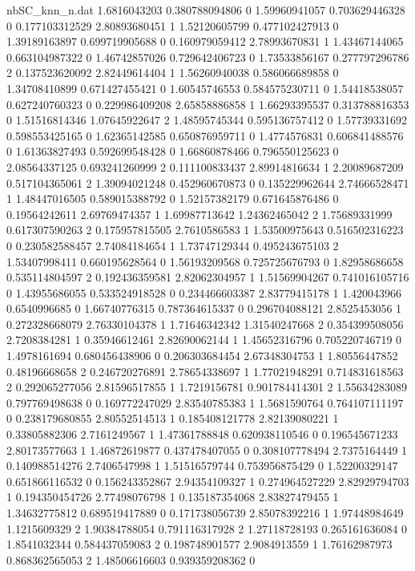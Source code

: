 \begin{filecontents}{nbSC_knn_n.dat}
1.6816043203 0.380788094806 0
1.59960941057 0.703629446328 0
0.177103312529 2.80893680451 1
1.52120605799 0.477102427913 0
1.39189163897 0.699719905688 0
0.160979059412 2.78993670831 1
1.43467144065 0.663104987322 0
1.46742857026 0.729642406723 0
1.73533856167 0.277797296786 2
0.137523620092 2.82449614404 1
1.56260940038 0.586066689858 0
1.34708410899 0.671427455421 0
1.60545746553 0.584575230711 0
1.54418538057 0.627240760323 0
0.229986409208 2.65858886858 1
1.66293395537 0.313788816353 0
1.51516814346 1.07645922647 2
1.48595745344 0.595136757412 0
1.57739331692 0.598553425165 0
1.62365142585 0.650876959711 0
1.4774576831 0.606841488576 0
1.61363827493 0.592699548428 0
1.66860878466 0.796550125623 0
2.08564337125 0.693241260999 2
0.111100833437 2.89914816634 1
2.20089687209 0.517104365061 2
1.39094021248 0.452960670873 0
0.135229962644 2.74666528471 1
1.48447016505 0.589015388792 0
1.52157382179 0.671645876486 0
0.19564242611 2.69769474357 1
1.69987713642 1.24362465042 2
1.75689331999 0.617307590263 2
0.175957815505 2.7610586583 1
1.53500975643 0.516502316223 0
0.230582588457 2.74084184654 1
1.73747129344 0.495243675103 2
1.53407998411 0.660195628564 0
1.56193209568 0.725725676793 0
1.82958686658 0.535114804597 2
0.192436359581 2.82062304957 1
1.51569904267 0.741016105716 0
1.43955686055 0.533524918528 0
0.234466603387 2.83779415178 1
1.420043966 0.6540996685 0
1.66740776315 0.787364615337 0
0.296704088121 2.8525453056 1
0.272328668079 2.76330104378 1
1.71646342342 1.31540247668 2
0.354399508056 2.7208384281 1
0.35946612461 2.82690062144 1
1.45652316796 0.705220746719 0
1.4978161694 0.680456438906 0
0.206303684454 2.67348304753 1
1.80556447852 0.48196668658 2
0.246720276891 2.78654338697 1
1.77021948291 0.714831618563 2
0.292065277056 2.81596517855 1
1.7219156781 0.901784414301 2
1.55634283089 0.797769498638 0
0.169772247029 2.83540785383 1
1.5681590764 0.764107111197 0
0.238179680855 2.80552514513 1
0.185408121778 2.82139080221 1
0.33805882306 2.7161249567 1
1.47361788848 0.620938110546 0
0.196545671233 2.80173577663 1
1.46872619877 0.437478407055 0
0.308107778494 2.7375164449 1
0.140988514276 2.7406547998 1
1.51516579744 0.753956875429 0
1.52200329147 0.651866116532 0
0.156243352867 2.94354109327 1
0.274964527229 2.82929794703 1
0.194350454726 2.77498076798 1
0.135187354068 2.83827479455 1
1.34632775812 0.689519417889 0
0.171738056739 2.85078392216 1
1.97448984649 1.1215609329 2
1.90384788054 0.791116317928 2
1.27118728193 0.265161636084 0
1.8541032344 0.584437059083 2
0.198748901577 2.9084913559 1
1.76162987973 0.868362565053 2
1.48506616603 0.939359208362 0

\end{filecontents}
